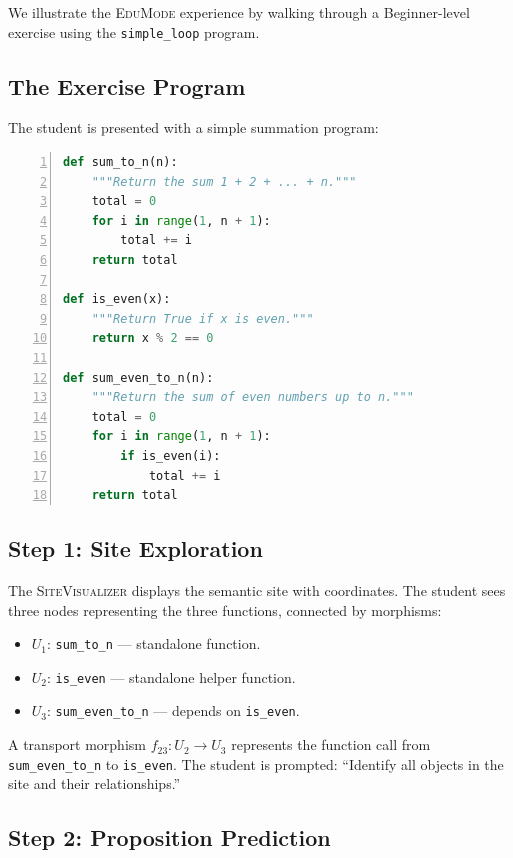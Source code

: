 \documentclass[11pt]{article}
\newcommand{\EduMode}{\textsc{EduMode}}
\newcommand{\SiteViz}{\textsc{SiteVisualizer}}
\begin{document}
We illustrate the \EduMode{} experience by walking through a Beginner-level
exercise using the \texttt{simple\_loop} program.

\subsection{The Exercise Program}

The student is presented with a simple summation program:

\begin{lstlisting}[language=Python,basicstyle=\small\ttfamily,
  frame=single,xleftmargin=1em,numbers=left]
def sum_to_n(n):
    """Return the sum 1 + 2 + ... + n."""
    total = 0
    for i in range(1, n + 1):
        total += i
    return total

def is_even(x):
    """Return True if x is even."""
    return x % 2 == 0

def sum_even_to_n(n):
    """Return the sum of even numbers up to n."""
    total = 0
    for i in range(1, n + 1):
        if is_even(i):
            total += i
    return total
\end{lstlisting}

\subsection{Step 1: Site Exploration}

The \SiteViz{} displays the semantic site with
\ppLXVIedusimpleloopCoords{} coordinates. The student sees three nodes
representing the three functions, connected by morphisms:
\begin{itemize}[leftmargin=*]
  \item $U_1$: \texttt{sum\_to\_n} --- standalone function.
  \item $U_2$: \texttt{is\_even} --- standalone helper function.
  \item $U_3$: \texttt{sum\_even\_to\_n} --- depends on \texttt{is\_even}.
\end{itemize}

A transport morphism $f_{23} : U_2 \to U_3$ represents the function call
from \texttt{sum\_even\_to\_n} to \texttt{is\_even}. The student is
prompted: ``Identify all objects in the site and their relationships.''

\subsection{Step 2: Proposition Prediction}
\end{document}

